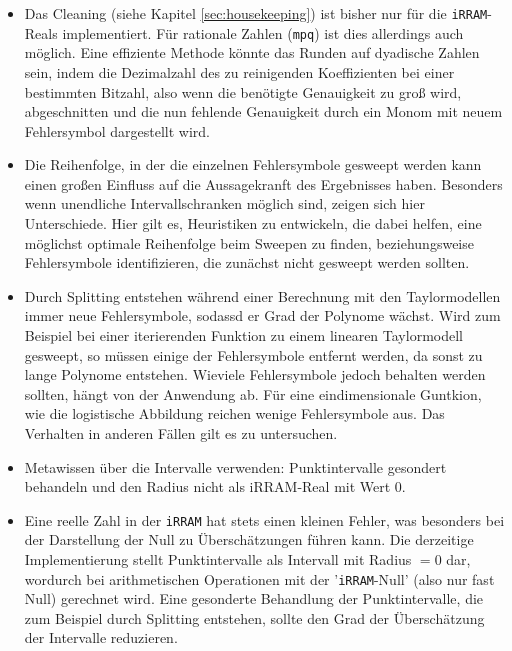 \begin{itemize}
    \item Das Cleaning (siehe Kapitel \ref{sec:housekeeping}) ist bisher nur für die \verb+iRRAM+-Reals implementiert. Für rationale Zahlen (\verb+mpq+) ist dies allerdings auch möglich. Eine effiziente Methode könnte das Runden auf dyadische Zahlen sein, indem die Dezimalzahl des zu reinigenden Koeffizienten bei einer bestimmten Bitzahl, also wenn die benötigte Genauigkeit zu groß wird, abgeschnitten und die nun fehlende Genauigkeit durch ein Monom mit neuem Fehlersymbol dargestellt wird.
    
    \item Die Reihenfolge, in der die einzelnen Fehlersymbole gesweept werden kann einen großen Einfluss auf die Aussagekranft des Ergebnisses haben. Besonders wenn unendliche Intervallschranken möglich sind, zeigen sich hier Unterschiede. Hier gilt es, Heuristiken zu entwickeln, die dabei helfen, eine möglichst optimale Reihenfolge beim Sweepen zu finden, beziehungsweise Fehlersymbole identifizieren, die zunächst nicht gesweept werden sollten.
    
    \item Durch Splitting entstehen während einer Berechnung mit den Taylormodellen immer neue Fehlersymbole, sodassd er Grad der Polynome wächst. Wird zum Beispiel bei einer iterierenden Funktion zu einem linearen Taylormodell gesweept, so müssen einige der Fehlersymbole entfernt werden, da sonst zu lange Polynome entstehen. Wieviele Fehlersymbole jedoch behalten werden sollten, hängt von der Anwendung ab. Für eine eindimensionale Guntkion, wie die logistische Abbildung reichen wenige Fehlersymbole aus. Das Verhalten in anderen Fällen gilt es zu untersuchen.
    
    \item Metawissen über die Intervalle verwenden: Punktintervalle gesondert behandeln und den Radius nicht als iRRAM-Real mit Wert 0.
    
    \item Eine reelle Zahl in der \verb+iRRAM+ hat stets einen kleinen Fehler, was besonders bei der Darstellung der Null zu Überschätzungen führen kann. Die derzeitige Implementierung stellt Punktintervalle als Intervall mit Radius $=0$ dar, wordurch bei arithmetischen Operationen mit der '\verb+iRRAM+-Null' (also nur fast Null) gerechnet wird. Eine gesonderte Behandlung der Punktintervalle, die zum Beispiel durch Splitting entstehen, sollte den Grad der Überschätzung der Intervalle reduzieren.
\end{itemize}

